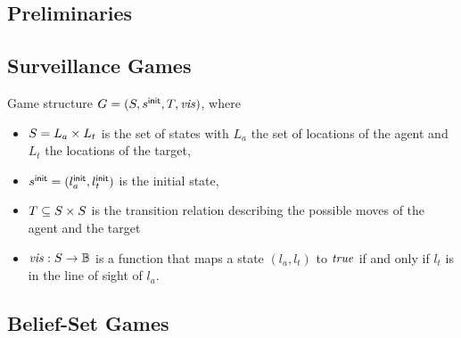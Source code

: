 \subsection{Preliminaries}

\subsection{Surveillance Games}
Game structure $G  = (S,s^{\mathsf{init}},T,\mathit{vis})$, where
\begin{itemize}
\item $S = L_a \times L_t$ is the set of states with $L_a$ the set of locations of the agent and $L_t$ the locations of the target,
\item $s^{\mathsf{init}} = (l_a^{\mathsf{init}},l_t^{\mathsf{init}})$ is the initial state,
\item $T \subseteq S \times S$ is the transition relation describing the possible moves of the agent and the target
\item $\mathit{vis} : S \to \mathbb{B}$ is a function that maps a state $(l_a,l_t)$ to $\mathit{true}$ if and only if $l_t$ is in the line of sight of $l_a$.
\end{itemize}

\subsection{Belief-Set Games}

